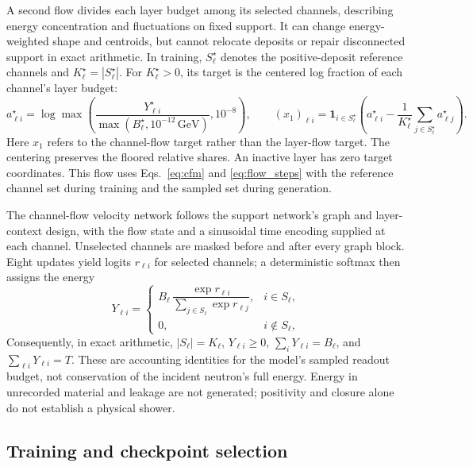 \documentclass[11pt]{article}
\newcommand{\GeV}{\,\mathrm{GeV}}
\begin{document}
A second flow divides each layer budget among its selected channels, describing energy concentration and fluctuations on fixed support. It can change energy-weighted shape and centroids, but cannot relocate deposits or repair disconnected support in exact arithmetic. In training, $S_\ell^\star$ denotes the positive-deposit reference channels and $K_\ell^\star=|S_\ell^\star|$. For $K_\ell^\star>0$, its target is the centered log fraction of each channel's layer budget:
\begin{equation}
 a_{\ell i}^\star=\log\max\!\left(
 \frac{Y_{\ell i}^\star}{\max(B_\ell^\star,10^{-12}\GeV)},10^{-8}\right),\qquad
 (x_1)_{\ell i}=\mathbf 1_{i\in S_\ell^\star}
 \left(a_{\ell i}^\star-\frac{1}{K_\ell^\star}
 \sum_{j\in S_\ell^\star}a_{\ell j}^\star\right).
 \label{eq:share_target}
\end{equation}
Here $x_1$ refers to the channel-flow target rather than the layer-flow target. The centering preserves the floored relative shares. An inactive layer has zero target coordinates. This flow uses Eqs.~\eqref{eq:cfm} and \eqref{eq:flow_steps} with the reference channel set during training and the sampled set during generation.

The channel-flow velocity network follows the support network's graph and layer-context design, with the flow state and a sinusoidal time encoding supplied at each channel. Unselected channels are masked before and after every graph block. Eight updates yield logits $r_{\ell i}$ for selected channels; a deterministic softmax then assigns the energy
\begin{equation}
 Y_{\ell i}=
 \begin{cases}
 B_\ell\,\dfrac{\exp r_{\ell i}}{\sum_{j\in S_\ell}\exp r_{\ell j}}, & i\in S_\ell,\\[6pt]
 0, & i\notin S_\ell,
 \end{cases}
 \label{eq:decoder}
\end{equation}
Consequently, in exact arithmetic, $|S_\ell|=K_\ell$, $Y_{\ell i}\geq0$, $\sum_iY_{\ell i}=B_\ell$, and $\sum_{\ell i}Y_{\ell i}=T$. These are accounting identities for the model's sampled readout budget, not conservation of the incident neutron's full energy. Energy in unrecorded material and leakage are not generated; positivity and closure alone do not establish a physical shower.

\subsection{Training and checkpoint selection}
\end{document}
